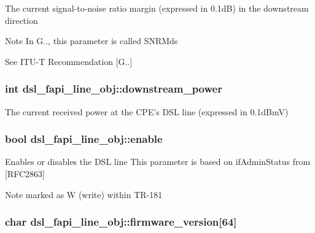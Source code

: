 The current signal-\/to-\/noise ratio margin (expressed in 0.\-1d\-B) in the downstream direction \begin{DoxyNote}{Note}
In G.., this parameter is called S\-N\-R\-Mds 

See I\-T\-U-\/\-T Recommendation \mbox{[}G..\mbox{]} 
\end{DoxyNote}
\hypertarget{structdsl__fapi__line__obj_a0d774a195b98a307a8d847d6ffe1860f}{
\subsubsection[{downstream\-\_\-power}]{\setlength{\rightskip}{0pt plus 5cm}int dsl\-\_\-fapi\-\_\-line\-\_\-obj\-::downstream\-\_\-power}}\label{structdsl__fapi__line__obj_a0d774a195b98a307a8d847d6ffe1860f}
The current received power at the C\-P\-E's D\-S\-L line (expressed in 0.\-1d\-Bm\-V) \hypertarget{structdsl__fapi__line__obj_a1df3e86a3e373ccb8088d7512fe4ca2d}{
\subsubsection[{enable}]{\setlength{\rightskip}{0pt plus 5cm}bool dsl\-\_\-fapi\-\_\-line\-\_\-obj\-::enable}}\label{structdsl__fapi__line__obj_a1df3e86a3e373ccb8088d7512fe4ca2d}
Enables or disables the D\-S\-L line This parameter is based on if\-Admin\-Status from \mbox{[}R\-F\-C2863\mbox{]} \begin{DoxyNote}{Note}
marked as W (write) within T\-R-\/181 
\end{DoxyNote}
\hypertarget{structdsl__fapi__line__obj_a8af792db1176f3c9644c38306f881f4f}{
\subsubsection[{firmware\-\_\-version}]{\setlength{\rightskip}{0pt plus 5cm}char dsl\-\_\-fapi\-\_\-line\-\_\-obj\-::firmware\-\_\-version\mbox{[}64\mbox{]}}}\label{structdsl__fapi__line__obj_a8af792db1176f3c9644c38306f881f4f}
